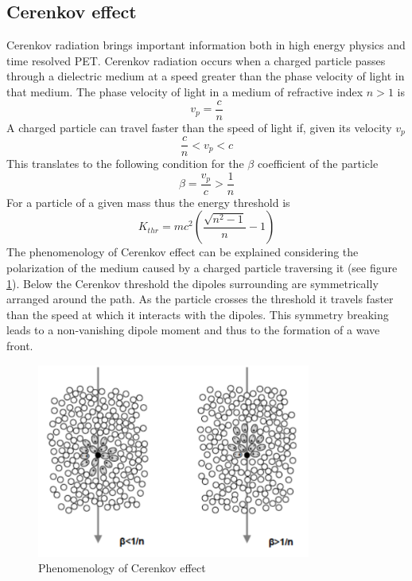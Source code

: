 \subsection{Cerenkov effect}
Cerenkov radiation brings important information both in high energy physics and time resolved PET.
Cerenkov radiation occurs when a charged particle passes through a dielectric medium at a speed greater than the phase velocity of light in that medium.
The phase velocity of light in a medium of refractive index $n > 1$ is
\begin{equation}
v_{p} = \frac{c}{n}
\end{equation}
A charged particle can travel faster than the speed of light if, given its velocity $v_{p}$ 
\begin{equation}
\frac{c}{n} < v_{p} < c
\end{equation}
This translates to the following condition for the $\beta$ coefficient of the particle
\begin{equation}
\beta = \frac{v_{p}}{c} > \frac{1}{n}
\end{equation}
For a particle of a given mass thus the energy threshold is
\begin{equation}
K_{thr} = mc^{2}\left( \frac{\sqrt {n^{2}-1}}{n} - 1 \right)
\label{eq:thr}
\end{equation}
The phenomenology of Cerenkov effect can be explained considering the polarization of the medium caused by a charged particle traversing it (see figure \ref{fig:cerenkov}).
Below the Cerenkov threshold the dipoles surrounding are symmetrically arranged around the path. As the particle crosses the threshold it travels faster than the speed at which it interacts with the dipoles. This symmetry breaking leads to a non-vanishing dipole moment and thus to the formation of a wave front.

\begin{figure}[htbp]
\centering
\includegraphics[width=9cm]{../Pictures/Chapter_2/cerenkov.pdf}
\caption[Cerenkov effect]{Phenomenology of Cerenkov effect}
\label{fig:cerenkov}
\end{figure}

